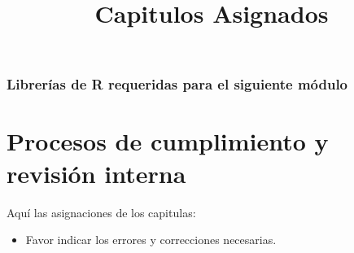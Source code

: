 \documentclass[
  12pt,
  letterpaper,
]{book}
\title{Capitulos Asignados}
\author{}
\date{}
\providecommand{\tightlist}{%
  \setlength{\itemsep}{0pt}\setlength{\parskip}{0pt}}\usepackage{longtable,booktabs,array}
\renewcommand*\contentsname{Table of contents}
\newcommand\contentsname{Table of contents}
\begin{document}
\frontmatter
\maketitle

\renewcommand*\contentsname{Table of contents}
{
\hypersetup{linkcolor=}
\setcounter{tocdepth}{2}
\tableofcontents
}

\mainmatter
\subsection{Librerías de R requeridas para el siguiente
módulo}\label{libreruxedas-de-r-requeridas-para-el-siguiente-muxf3dulo}

\chapter{Procesos de cumplimiento y revisión
interna}\label{procesos-de-cumplimiento-y-revisiuxf3n-interna}

Aquí las asignaciones de los capitulas:

\begin{itemize}
\tightlist
\item
  Favor indicar los errores y correcciones necesarias.
\end{itemize}
\end{document}
